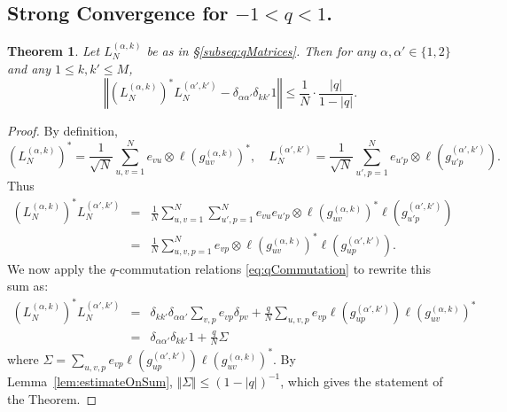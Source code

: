 \documentclass[11pt]{article}
\newtheorem{theorem}{Theorem}
\begin{document}
\subsection{Strong Convergence for $-1<q<1$.}
\begin{theorem} \label{thrm:qEstimate}
Let $L_N^{(\alpha,k)}$ be as in \S\ref{subseq:qMatrices}.  Then for any $\alpha,\alpha'\in \{1,2\}$ and any  $1\leq k,k'\leq M$, 
$$ \left\Vert (L_N^{(\alpha,k)})^* L_N^{(\alpha',k')} - \delta_{\alpha\alpha'}\delta_{kk'} 1\right\Vert \leq \frac{1}{N}\cdot \frac{|q|}{1-|q|}.$$
\end{theorem}
\begin{proof}
    By definition, $$(L_N^{(\alpha,k)})^* = \frac{1}{\sqrt{N}} \sum_{u,v=1}^N e_{vu} \otimes \ell(g_{uv}^{(\alpha,k)})^*,\quad L_N^{(\alpha',k')} = \frac{1}{\sqrt{N}} \sum_{u',p=1}^N e_{u'p} \otimes \ell(g_{u'p}^{(\alpha',k')}).$$
    Thus 
    \begin{eqnarray*}
        (L_N^{(\alpha,k)})^* L_N^{(\alpha',k')} &=& 
        \frac{1}{N} \sum_{u,v=1}^N \sum_{u',p=1}^N e_{vu} e_{u'p}  \otimes \ell(g_{uv}^{(\alpha,k)})^* \ell(g_{u'p}^{(\alpha',k')} ) \\ 
        &=& \frac{1}{N} \sum_{u,v,p=1}^N e_{vp} \otimes \ell(g_{uv}^{(\alpha,k)})^* \ell(g_{up}^{(\alpha',k')} ).
    \end{eqnarray*}
    We now apply the $q$-commutation relations \eqref{eq:qCommutation} to rewrite this sum as:
     \begin{eqnarray*}
        (L_N^{(\alpha,k)})^* L_N^{(\alpha',k')} &=& 
         \delta_{kk'}\delta_{\alpha\alpha'}\sum_{v,p} e_{vp} \delta_{pv}
        + 
        \frac{q}{N} \sum_{u,v,p} e_{vp} \ell(g_{up}^{(\alpha',k')} )\ell(g_{uv}^{(\alpha,k)})^*  \\
        &=& \delta_{\alpha\alpha'}  \delta_{kk'}1 +\frac{q}{N} \Sigma
    \end{eqnarray*}
    where $\Sigma = \sum_{u,v,p} e_{vp} \ell(g_{up}^{(\alpha',k')} )\ell(g_{uv}^{(\alpha,k)})^*$.  By Lemma~\ref{lem:estimateOnSum}, $\Vert\Sigma \Vert \leq (1-|q|)^{-1}$, which gives the statement of the Theorem. 
\end{proof}
\end{document}
